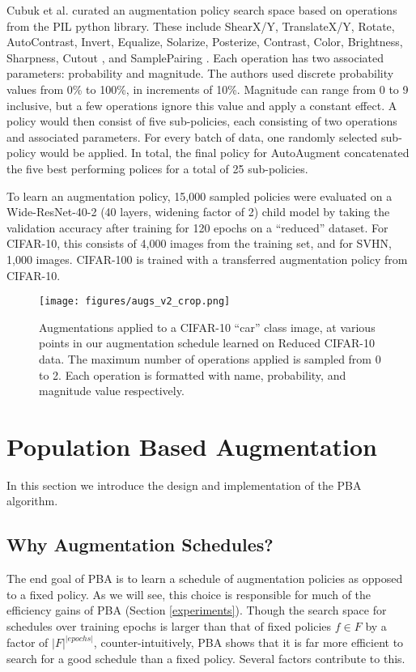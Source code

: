 \documentclass{article}
\begin{document}
Cubuk et al. curated an augmentation policy search space based on operations from the PIL python library. These include ShearX/Y, TranslateX/Y, Rotate, AutoContrast, Invert, Equalize, Solarize, Posterize, Contrast, Color, Brightness, Sharpness, Cutout \cite{cutout}, and SamplePairing \cite{samplepairing}. Each operation has two associated parameters: probability and magnitude. The authors used discrete probability values from 0\% to 100\%, in increments of 10\%. Magnitude can range from 0 to 9 inclusive, but a few operations ignore this value and apply a constant effect. A policy would then consist of five sub-policies, each consisting of two operations and associated parameters. For every batch of data, one randomly selected sub-policy would be applied. In total, the final policy for AutoAugment concatenated the five best performing polices for a total of 25 sub-policies. 

To learn an augmentation policy, 15,000 sampled policies were evaluated on a Wide-ResNet-40-2 (40 layers, widening factor of 2) child model \cite{wrn} by taking the validation accuracy after training for 120 epochs on a ``reduced'' dataset. For CIFAR-10, this consists of 4,000 images from the training set, and for SVHN, 1,000 images. CIFAR-100 is trained with a transferred augmentation policy from CIFAR-10.


\begin{figure}[t]
  \centering
  \texttt{[image: figures/augs\_v2\_crop.png]}
  \caption{Augmentations applied to a CIFAR-10 ``car'' class image, at various points in our augmentation schedule learned on Reduced CIFAR-10 data. The maximum number of operations applied is sampled from 0 to 2. Each operation is formatted with name, probability, and magnitude value respectively.}
  \label{fig:aug-viz}
\end{figure}

\section{Population Based Augmentation}
\label{augmentation}

In this section we introduce the design and implementation of the PBA algorithm.


\subsection{Why Augmentation Schedules?}
The end goal of PBA is to learn a schedule of augmentation policies as opposed to a fixed policy. As we will see, this choice is responsible for much of the efficiency gains of PBA (Section \ref{experiments}). Though the search space for schedules over training epochs is larger than that of fixed policies $f \in F$ by a factor of $|F|^{|epochs|}$, counter-intuitively, PBA shows that it is far more efficient to search for a good schedule than a fixed policy. Several factors contribute to this.
\end{document}
